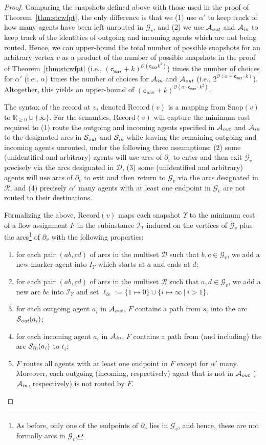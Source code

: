 \documentclass[letterpaper]{article} %
\newcommand{\bigoh}{\ensuremath{{\mathcal O}}}
\newcommand{\cmax}{\mathtt{c_{max}}}
\newcommand{\forgottenG}{\mathcal{G}}
\newcommand{\Rec}{\text{Record}}
\renewcommand{\R}{\mathcal{R}}
\renewcommand{\D}{\mathcal{D}}
\newcommand{\Sout}{\mathcal{S}_\emph{out}}
\newcommand{\Sin}{\mathcal{S}_\emph{in}}
\newcommand{\Aout}{\mathcal{A}_\emph{out}}
\newcommand{\Ain}{\mathcal{A}_\emph{in}}
\newcommand{\snap}{\text{Snap}}
\begin{document}
\begin{proof}
Comparing the snapshots defined above with those used in the proof of Theorem~\ref{thm:stcwfpt}, the only difference is that we (1) use $\alpha'$ to keep track of how many agents have been left unrouted in $\forgottenG_v$, and (2) we use $\Aout$ and $\Ain$ to keep track of the identities of outgoing and incoming agents which are not being routed. Hence, we can upper-bound the total number of possible snapshots for an arbitrary vertex $v$ as a product of the number of possible snapshots in the proof of Theorem~\ref{thm:stcwfpt} (i.e., $(\cmax+k)^{\bigoh(\cmax k^2)}$) times the number of choices for $\alpha'$ (i.e., $\alpha$) times the number of choices for $\Ain$ and $\Aout$ (i.e., $2^{\bigoh(\alpha+\cmax\cdot k)}$). Altogether, this yields an upper-bound of $(\cmax+k)^{\bigoh(\alpha \cdot \cmax \cdot k^2)}$. 

The syntax of the record at $v$, denoted $\Rec(v)$ is a mapping from $\snap(v)$ to $\mathbb{R}_{\geq 0}\cup \{\infty\}$. For the semantics, $\Rec(v)$ will capture the minimum cost required to (1) route the outgoing and incoming agents specified in $\Aout$ and $\Ain$ to the designated arcs in $\Sout$ and $\Sin$ while leaving the remaining outgoing and incoming agents unrouted, under the following three assumptions: (2) some (unidentified and arbitrary) agents will use arcs of $\partial_v$ to enter and then exit $\forgottenG_v$ precisely via the arcs designated in $\D$, (3) some (unidentified and arbitrary) agents will use arcs of $\partial_v$ to exit and then return to $\forgottenG_v$ via the arcs designated in $\R$, and (4) precisely $\alpha'$ many agents with at least one endpoint in $\forgottenG_v$ are not routed to their destinations. 

Formalizing the above, $\Rec(v)$ maps each snapshot $\Upsilon$ to the minimum cost of a flow assignment $F$ in the subinstance $\mathcal{I}_\Upsilon$ induced on the vertices of $\forgottenG_v$ plus the arcs\footnote{As before, only one of the endpoints of $\partial_v$ lies in $\forgottenG_v$, and hence, these are not formally arcs in $\forgottenG_v$.} of $\partial_v$ with the following properties:
\begin{enumerate}
\item for each pair $(ab,cd)$ of arcs in the multiset $\D$ such that $b,c\in \forgottenG_v$, we add a new marker agent into $I_\Upsilon$ which starts at $a$ and ends at $d$;
\item for each pair $(ab,cd)$ of arcs in the multiset $\R$ such that $a,d\in \forgottenG_v$, we add a new arc $bc$ into $\mathcal{I}_\Upsilon$ and set $\ell_{bc}:=\{1\mapsto 0\}\cup \{i\mapsto \infty~|~i>1\}$.
\item for each outgoing agent $a_i$ in $\Aout$, $F$ contains a path from $s_i$ into the arc $\Sout(a_i)$;
\item for each incoming agent $a_i$ in $\Ain$, $F$ contains a path from (and including) the arc $\Sin(a_i)$ to $t_i$;
\item $F$ routes all agents with at least one endpoint in $F$ except for $\alpha'$ many. Moreover, each outgoing (incoming, respectively) agent that is not in $\Aout$ ($\Ain$, respectively) is not routed by $F$.
\end{enumerate}


\end{proof}
\end{document}
